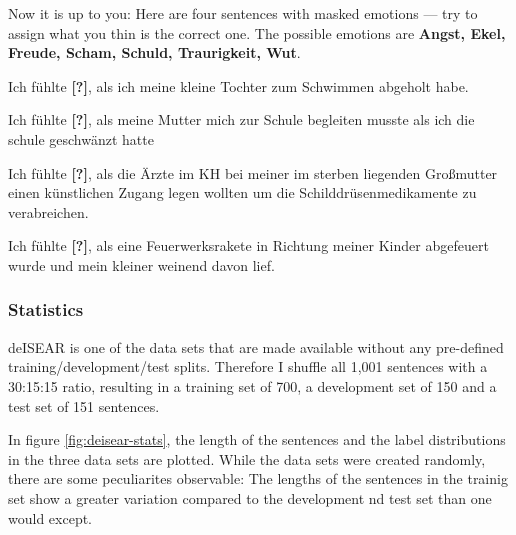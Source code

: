 Now it is up to you: Here are four sentences with masked emotions --- try to assign what you thin is the correct one.
The possible emotions are \textbf{Angst, Ekel, Freude, Scham, Schuld, Traurigkeit, Wut}.


\begin{examples}
  \item \label{itm:deisear1} Ich fühlte \textbf{[?]}, als ich meine kleine Tochter zum Schwimmen abgeholt habe.
  \item \label{itm:deisear2} Ich fühlte \textbf{[?]}, als meine Mutter mich zur Schule begleiten musste als ich die schule geschwänzt hatte
  \item \label{itm:deisear3} Ich fühlte \textbf{[?]}, als die Ärzte im KH bei meiner im sterben liegenden Großmutter einen künstlichen Zugang legen wollten um die Schilddrüsenmedikamente zu verabreichen.
  \item \label{itm:deisear4} Ich fühlte \textbf{[?]}, als eine Feuerwerksrakete in Richtung meiner Kinder abgefeuert wurde und mein kleiner weinend davon lief.
\end{examples}



\subsubsection{Statistics}

deISEAR is one of the data sets that are made available without any pre-defined training/development/test splits.
Therefore I shuffle all 1,001 sentences with a 30:15:15 ratio, resulting in a training set of 700, a development set
of 150 and a test set of 151 sentences.

In figure \ref{fig:deisear-stats}, the length of the sentences and the label distributions in the three data sets are
plotted. While the data sets were created randomly, there are some peculiarites observable: The lengths of the sentences
in the trainig set show a greater variation compared to the development nd test set than one would except.

